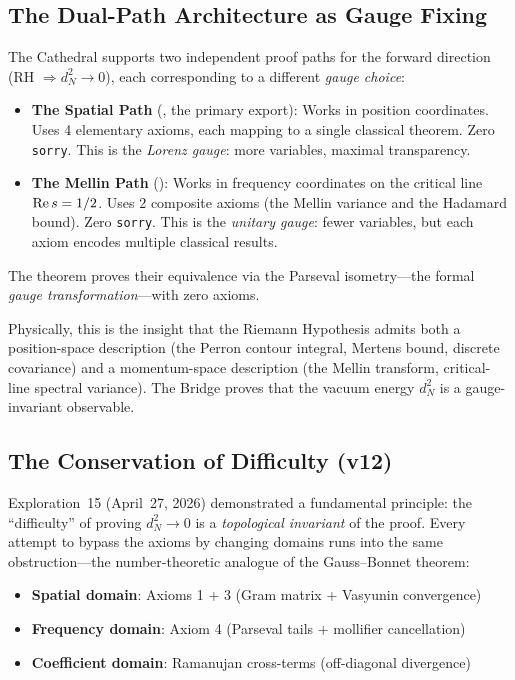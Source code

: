 \subsection{The Dual-Path Architecture as Gauge Fixing}

The Cathedral supports two independent proof paths for the forward
direction (RH $\Rightarrow d_N^2 \to 0$), each corresponding to a
different \emph{gauge choice}:

\begin{itemize}
  \item \textbf{The Spatial Path} (,
    the primary export): Works in position coordinates. Uses 4 elementary
    axioms, each mapping to a single classical theorem. Zero \texttt{sorry}.
    This is the \emph{Lorenz gauge}: more variables, maximal transparency.

  \item \textbf{The Mellin Path} ():
    Works in frequency coordinates on the critical line $\operatorname{Re} s = 1/2$.
    Uses 2 composite axioms (the Mellin variance and the Hadamard bound).
    Zero \texttt{sorry}. This is the \emph{unitary gauge}: fewer
    variables, but each axiom encodes multiple classical results.
\end{itemize}

The  theorem proves their equivalence
via the Parseval isometry---the formal \emph{gauge transformation}---with
zero axioms.

Physically, this is the insight that the Riemann Hypothesis admits both
a position-space description (the Perron contour integral, Mertens bound,
discrete covariance) and a momentum-space description (the Mellin
transform, critical-line spectral variance). The Bridge proves that
the vacuum energy $d_N^2$ is a gauge-invariant observable.

\subsection{The Conservation of Difficulty (v12)}

Exploration~15 (April~27, 2026) demonstrated a fundamental principle:
the ``difficulty'' of proving $d_N^2 \to 0$ is a
\emph{topological invariant} of the proof. Every attempt to bypass
the axioms by changing domains runs into the same obstruction---the
number-theoretic analogue of the Gauss--Bonnet theorem:

\begin{itemize}
  \item \textbf{Spatial domain}: Axioms 1 + 3 (Gram matrix + Vasyunin convergence)
  \item \textbf{Frequency domain}: Axiom 4 (Parseval tails + mollifier cancellation)
  \item \textbf{Coefficient domain}: Ramanujan cross-terms (off-diagonal divergence)
\end{itemize}

